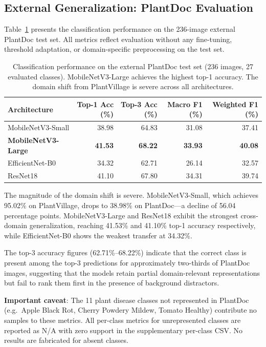 \documentclass[pdflatex,sn-mathphys-num]{sn-jnl}
\begin{document}
\subsection{External Generalization: PlantDoc Evaluation}
\label{sec:results_plantdoc}

Table~\ref{tab:plantdoc_results} presents the classification performance on the 236-image
external PlantDoc test set. All metrics reflect evaluation without any fine-tuning,
threshold adaptation, or domain-specific preprocessing on the test set.

\begin{table}[H]
\caption{Classification performance on the external PlantDoc test set (236 images,
27 evaluated classes). MobileNetV3-Large achieves the highest top-1 accuracy.
The domain shift from PlantVillage is severe across all architectures.}
\label{tab:plantdoc_results}
\centering
\begin{tabular}{lrrrr}
\toprule
\textbf{Architecture} & \textbf{Top-1 Acc (\%)} & \textbf{Top-3 Acc (\%)} &
\textbf{Macro F1 (\%)} & \textbf{Weighted F1 (\%)} \\
\midrule
MobileNetV3-Small  & 38.98 & 64.83 & 31.08 & 37.41 \\
\textbf{MobileNetV3-Large}  & \textbf{41.53} & \textbf{68.22} & \textbf{33.93} & \textbf{40.08} \\
EfficientNet-B0    & 34.32 & 62.71 & 26.14 & 32.57 \\
ResNet18           & 41.10 & 67.80 & 34.31 & 39.74 \\
\bottomrule
\end{tabular}
\end{table}

The magnitude of the domain shift is severe. MobileNetV3-Small, which achieves 95.02\%
on PlantVillage, drops to 38.98\% on PlantDoc---a decline of 56.04 percentage points.
MobileNetV3-Large and ResNet18 exhibit the strongest cross-domain generalization,
reaching 41.53\% and 41.10\% top-1 accuracy respectively, while EfficientNet-B0
shows the weakest transfer at 34.32\%.

The top-3 accuracy figures (62.71\%--68.22\%) indicate that the correct class is
present among the top-3 predictions for approximately two-thirds of PlantDoc images,
suggesting that the models retain partial domain-relevant representations but fail to
rank them first in the presence of background distractors.

\textbf{Important caveat}: The 11 plant disease classes not represented in PlantDoc
(e.g.\ Apple Black Rot, Cherry Powdery Mildew, Tomato Healthy) contribute no samples
to these metrics. All per-class metrics for unrepresented classes are reported as N/A
with zero support in the supplementary per-class CSV. No results are fabricated for
absent classes.
\end{document}
